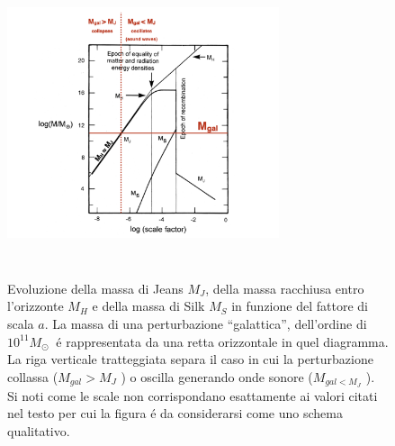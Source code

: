 \documentclass[12pt, a4paper]{article}
\begin{document}
\begin{figure}[htp]
\centering
\includegraphics[width=8cm, height=9cm]{images/massev.png}
\caption{Evoluzione della massa di Jeans $M_J$, della massa racchiusa entro l’orizzonte $M_H$ e della massa di Silk $M_S$ in funzione del fattore di scala $a$. La massa di una perturbazione “galattica”, dell’ordine di $10^{11}M_\odot\ $  \'{e} rappresentata da una retta orizzontale in quel diagramma. La riga verticale tratteggiata separa il caso in cui la perturbazione collassa ($M_{gal}>M_J$ ) o oscilla generando onde sonore ($M_{gal <M_J}$ ). Si noti come le scale non corrispondano esattamente ai valori citati nel testo per cui la figura \'{e} da considerarsi come uno schema qualitativo.}
    \label{fig:massev}
\end{figure}
\end{document}
